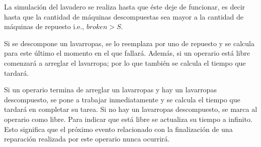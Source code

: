     \par La simulación del lavadero se realiza hasta que éste deje de funcionar,
    es decir hasta que la cantidad de máquinas descompuestas sea mayor a la
    cantidad de máquinas de repuesto i.e., $ broken > S $.

    \par Si se descompone un lavarropas, se lo reemplaza por uno de repuesto y
    se calcula para este último el momento en el que fallará. Además, si un
    operario está libre comenzará a arreglar el lavarropa; por lo que también se
    calcula el tiempo que tardará.

    \par Si un operario termina de arreglar un lavarropas y hay un lavarropas
    descompuesto, se pone a trabajar inmediatamente y se calcula el tiempo que
    tardará en completar su tarea. Si no hay un lavarropas descompuesto, se
    marca al operario como libre. Para indicar que está libre se actualiza su
    tiempo a infinito. Esto significa que el próximo evento relacionado con la
    finalización de una reparación realizada por este operario nunca ocurrirá.

\pagebreak
